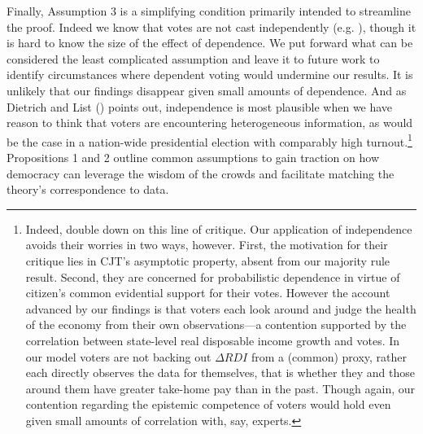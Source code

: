 \documentclass[11pt]{article}
\begin{document}

Finally, Assumption 3 is a simplifying condition primarily intended  to streamline the proof. Indeed we know that votes are not cast independently (e.g. \citet{sinclair2012social}), though it is hard to know the size of the effect of dependence. We put forward what can be considered the least complicated assumption and leave it to future work to identify circumstances where dependent voting would undermine our results. It is unlikely that our findings disappear given small amounts of dependence. And as Dietrich and List (\citeyear{Dietrich2004}) points out, independence is most plausible when we have reason to think that voters are encountering heterogeneous information, as would be the case in a nation-wide presidential election with comparably high turnout.\footnote{Indeed, \cite{dietrich2013epistemic} double down on this line of critique. Our application of independence avoids their worries in two ways, however. First, the motivation for their critique lies in CJT's asymptotic property, absent from our majority rule result. Second, they are concerned for probabilistic dependence  in virtue of citizen's common evidential support for their votes. However the account advanced by our findings is that voters each look around and judge the health of the economy from their own observations---a contention supported by the correlation between state-level real disposable income growth and votes. In our model voters are not backing out $\Delta RDI$ from a (common) proxy, rather each directly observes the data for themselves, that is whether they and those around them have greater take-home pay than in the past. Though again, our contention regarding the epistemic competence of voters would hold even given small amounts of correlation with, say, experts.} Propositions 1 and 2 outline common assumptions to gain traction on how democracy can leverage the wisdom of the crowds and facilitate matching the theory's correspondence to data.
\end{document}
